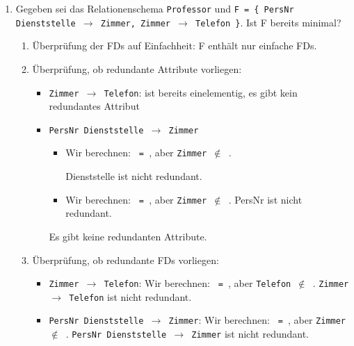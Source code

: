 \documentclass{bschlangaul-haupt}
\begin{document}
\begin{enumerate}

%

\item Gegeben sei das Relationenschema
\texttt{Professor}
und
\texttt{F = \{
  PersNr Dienststelle $\rightarrow$ Zimmer,
  Zimmer $\rightarrow$ Telefon
\}}.
Ist F bereits minimal?

\begin{liAntwort}

\begin{enumerate}
\item Überprüfung der FDs auf Einfachheit: F enthält nur einfache FDs.

\item Überprüfung, ob redundante Attribute vorliegen:

\begin{itemize}
\item \texttt{Zimmer $\rightarrow$ Telefon}: \texttt{} ist
bereits einelementig, \dh es gibt kein redundantes Attribut

\item \texttt{PersNr Dienststelle $\rightarrow$ Zimmer}

\begin{itemize}
\item Wir berechnen:
\texttt{ = }, aber
\texttt{Zimmer $\notin$ }.

Dienststelle ist nicht redundant.

\item Wir berechnen:
\texttt{ = },
aber
\texttt{Zimmer $\notin$ }.
PersNr ist nicht redundant.
\end{itemize}

Es gibt keine redundanten Attribute.
\end{itemize}

\item Überprüfung, ob redundante FDs vorliegen:

\begin{itemize}
\item \texttt{Zimmer $\rightarrow$ Telefon}:
Wir berechnen:
\texttt{ = },
aber
\texttt{Telefon $\notin$ }.
\texttt{Zimmer $\rightarrow$ Telefon} ist nicht redundant.

\item \texttt{PersNr Dienststelle $\rightarrow$ Zimmer}:
Wir berechnen:
\texttt{ =
},
aber
\texttt{Zimmer $\notin$ }.
\texttt{PersNr Dienststelle $\rightarrow$ Zimmer} ist nicht redundant.
\end{itemize}


\end{enumerate}
\end{liAntwort}
\end{enumerate}
\end{document}
